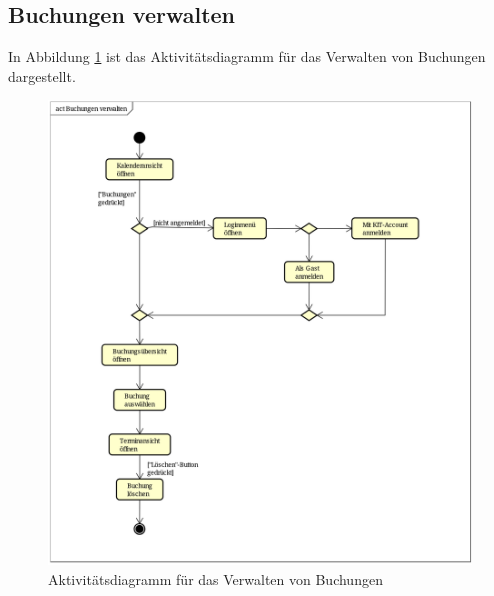 \subsection{Buchungen verwalten}
In Abbildung \ref{fig:activity_diagram_booking_manage} ist das Aktivitätsdiagramm für das Verwalten von Buchungen dargestellt.
\begin{figure}[ht]
    \centering
    \includegraphics[scale=0.15]{figures/activitydiagrams/buchungverwalten}
    \caption{Aktivitätsdiagramm für das Verwalten von Buchungen}
    \label{fig:activity_diagram_booking_manage}
\end{figure}

\clearpage
